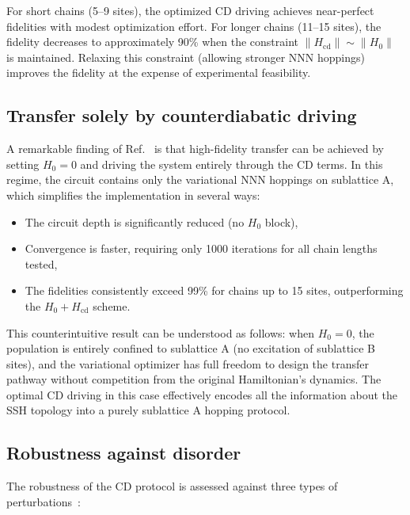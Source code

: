 \documentclass[
  reprint,
  amsmath,
  amssymb,
  aps,
  prb,
  longbibliography,
]{revtex4-2}
\begin{document}
For short chains (5--9 sites), the optimized CD driving achieves near-perfect
fidelities with modest optimization effort. For longer chains (11--15 sites),
the fidelity decreases to approximately 90\% when the constraint
$\|H_{\mathrm{cd}}\| \sim \|H_0\|$ is maintained. Relaxing this constraint
(allowing stronger NNN hoppings) improves the fidelity at the expense of
experimental feasibility.

\subsection{Transfer solely by counterdiabatic driving}
\label{sec:cd_only}

A remarkable finding of Ref.~\cite{Romero2024} is that high-fidelity
transfer can be achieved by setting $H_0 = 0$ and driving the system
entirely through the CD terms. In this regime, the circuit contains
only the variational NNN hoppings on sublattice A, which simplifies the
implementation in several ways:
\begin{itemize}
  \item The circuit depth is significantly reduced (no $H_0$ block),
  \item Convergence is faster, requiring only 1000 iterations for all chain
    lengths tested,
  \item The fidelities consistently exceed 99\% for chains up to 15 sites,
    outperforming the $H_0 + H_{\mathrm{cd}}$ scheme.
\end{itemize}

This counterintuitive result can be understood as follows: when $H_0 = 0$,
the population is entirely confined to sublattice A (no excitation of
sublattice B sites), and the variational optimizer has full freedom to design
the transfer pathway without competition from the original Hamiltonian's
dynamics. The optimal CD driving in this case effectively encodes all the
information about the SSH topology into a purely sublattice A hopping
protocol.

\subsection{Robustness against disorder}
\label{sec:cd_robustness}

The robustness of the CD protocol is assessed against three types of
perturbations~\cite{Romero2024}:
\end{document}
